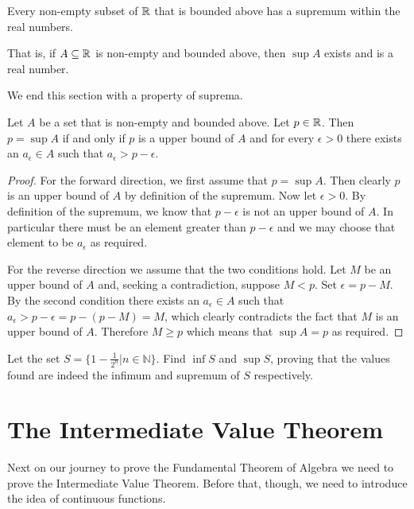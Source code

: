\begin{axiom}[Completeness]\label{axiom-completeness}
    Every non-empty subset of $\mathbb{R}$ that is bounded above has a supremum within the real numbers.

    That is, if $A \subseteq \mathbb{R}$ is non-empty and bounded above, then $\sup A$ exists and is a real number.
\end{axiom}

We end this section with a property of suprema.
\begin{proposition}\label{prop-identifying-suprema}
    Let $A$ be a set that is non-empty and bounded above. Let $p \in \mathbb{R}$. Then $p = \sup A$ if and only if $p$ is a upper bound of $A$ and for every $\epsilon > 0$ there exists an $a_\epsilon \in A$ such that $a_\epsilon > p - \epsilon$.
\end{proposition}
\begin{proof}
    For the forward direction, we first assume that $p = \sup A$. Then clearly $p$ is an upper bound of $A$ by definition of the supremum. Now let $\epsilon > 0$. By definition of the supremum, we know that $p - \epsilon$ is not an upper bound of $A$. In particular there must be an element greater than $p - \epsilon$ and we may choose that element to be $a_\epsilon$ as required.

    For the reverse direction we assume that the two conditions hold. Let $M$ be an upper bound of $A$ and, seeking a contradiction, suppose $M < p$. Set $\epsilon = p - M$. By the second condition there exists an $a_\epsilon \in A $ such that $a_\epsilon > p - \epsilon = p - (p - M) = M$, which clearly contradicts the fact that $M$ is an upper bound of $A$. Therefore $M \geq p$ which means that $\sup A = p$ as required.
\end{proof}

\begin{exercise}
    Let the set $S = \{1 - \frac1{2^n} \vert n \in \mathbb{N}\}$. Find $\inf S$ and $\sup S$, proving that the values found are indeed the infimum and supremum of $S$ respectively.
\end{exercise}

\section{The Intermediate Value Theorem}
Next on our journey to prove the Fundamental Theorem of Algebra we need to prove the Intermediate Value Theorem. Before that, though, we need to introduce the idea of continuous functions.

